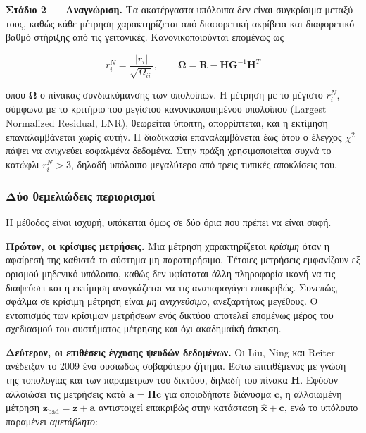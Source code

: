 \textbf{Στάδιο 2 --- Αναγνώριση.} Τα ακατέργαστα υπόλοιπα δεν είναι συγκρίσιμα μεταξύ τους,
καθώς κάθε μέτρηση χαρακτηρίζεται από διαφορετική ακρίβεια και διαφορετικό βαθμό στήριξης
από τις γειτονικές. Κανονικοποιούνται επομένως ως

\begin{equation}
r_i^{N} = \frac{|r_i|}{\sqrt{\Omega_{ii}}}, \qquad
\boldsymbol{\Omega} = \mathbf{R} - \mathbf{H}\mathbf{G}^{-1}\mathbf{H}^{T}
\label{eq:normres}
\end{equation}

όπου $\boldsymbol{\Omega}$ ο πίνακας συνδιακύμανσης των υπολοίπων. Η μέτρηση με το μέγιστο
$r_i^{N}$, σύμφωνα με το κριτήριο του μεγίστου κανονικοποιημένου υπολοίπου (Largest
Normalized Residual, LNR), θεωρείται ύποπτη, απορρίπτεται, και η εκτίμηση επαναλαμβάνεται χωρίς
αυτήν. Η διαδικασία επαναλαμβάνεται έως ότου ο έλεγχος $\chi^2$ πάψει να ανιχνεύει εσφαλμένα
δεδομένα. Στην πράξη χρησιμοποιείται συχνά το κατώφλι $r_i^{N} > 3$, δηλαδή υπόλοιπο
μεγαλύτερο από τρεις τυπικές αποκλίσεις του.

\subsubsection*{Δύο θεμελιώδεις περιορισμοί}

Η μέθοδος είναι ισχυρή, υπόκειται όμως σε δύο όρια που πρέπει να είναι σαφή.

\textbf{Πρώτον, οι κρίσιμες μετρήσεις.} Μια μέτρηση χαρακτηρίζεται \emph{κρίσιμη} όταν η
αφαίρεσή της καθιστά το σύστημα μη παρατηρήσιμο. Τέτοιες μετρήσεις εμφανίζουν εξ ορισμού
μηδενικό υπόλοιπο, καθώς δεν υφίσταται άλλη πληροφορία ικανή να τις διαψεύσει και η
εκτίμηση αναγκάζεται να τις αναπαραγάγει επακριβώς. Συνεπώς, σφάλμα σε κρίσιμη μέτρηση
είναι \emph{μη ανιχνεύσιμο}, ανεξαρτήτως μεγέθους. Ο εντοπισμός των κρίσιμων μετρήσεων ενός
δικτύου αποτελεί επομένως μέρος του σχεδιασμού του συστήματος μέτρησης και όχι ακαδημαϊκή
άσκηση.

\textbf{Δεύτερον, οι επιθέσεις έγχυσης ψευδών δεδομένων.} Οι Liu, Ning και Reiter ανέδειξαν
το 2009 ένα ουσιωδώς σοβαρότερο ζήτημα. Έστω επιτιθέμενος με γνώση της τοπολογίας και των
παραμέτρων του δικτύου, δηλαδή του πίνακα $\mathbf{H}$. Εφόσον αλλοιώσει τις μετρήσεις κατά
$\mathbf{a} = \mathbf{H}\mathbf{c}$ για οποιοδήποτε διάνυσμα $\mathbf{c}$, η αλλοιωμένη
μέτρηση $\mathbf{z}_{\text{bad}} = \mathbf{z} + \mathbf{a}$ αντιστοιχεί επακριβώς στην
κατάσταση $\hat{\mathbf{x}} + \mathbf{c}$, ενώ το υπόλοιπο παραμένει \emph{αμετάβλητο}:


